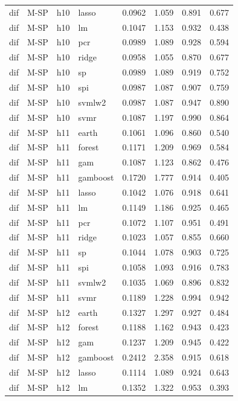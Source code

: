 \begin{ThreePartTable}
\begin{longtable}[t]{llclcccc}
dif & M-SP & h10 & lasso & 0.0962 & 1.059 & 0.891 & 0.677\\
dif & M-SP & h10 & lm & 0.1047 & 1.153 & 0.932 & 0.438\\
dif & M-SP & h10 & pcr & 0.0989 & 1.089 & 0.928 & 0.594\\
dif & M-SP & h10 & ridge & 0.0958 & 1.055 & 0.870 & 0.677\\
dif & M-SP & h10 & sp & 0.0989 & 1.089 & 0.919 & 0.752\\
dif & M-SP & h10 & spi & 0.0987 & 1.087 & 0.907 & 0.759\\
dif & M-SP & h10 & svmlw2 & 0.0987 & 1.087 & 0.947 & 0.890\\
dif & M-SP & h10 & svmr & 0.1087 & 1.197 & 0.990 & 0.864\\
\addlinespace
dif & M-SP & h11 & earth & 0.1061 & 1.096 & 0.860 & 0.540\\
dif & M-SP & h11 & forest & 0.1171 & 1.209 & 0.969 & 0.584\\
dif & M-SP & h11 & gam & 0.1087 & 1.123 & 0.862 & 0.476\\
dif & M-SP & h11 & gamboost & 0.1720 & 1.777 & 0.914 & 0.405\\
dif & M-SP & h11 & lasso & 0.1042 & 1.076 & 0.918 & 0.641\\
dif & M-SP & h11 & lm & 0.1149 & 1.186 & 0.925 & 0.465\\
dif & M-SP & h11 & pcr & 0.1072 & 1.107 & 0.951 & 0.491\\
dif & M-SP & h11 & ridge & 0.1023 & 1.057 & 0.855 & 0.660\\
dif & M-SP & h11 & sp & 0.1044 & 1.078 & 0.903 & 0.725\\
dif & M-SP & h11 & spi & 0.1058 & 1.093 & 0.916 & 0.783\\
dif & M-SP & h11 & svmlw2 & 0.1035 & 1.069 & 0.896 & 0.832\\
dif & M-SP & h11 & svmr & 0.1189 & 1.228 & 0.994 & 0.942\\
\addlinespace
dif & M-SP & h12 & earth & 0.1327 & 1.297 & 0.927 & 0.484\\
dif & M-SP & h12 & forest & 0.1188 & 1.162 & 0.943 & 0.423\\
dif & M-SP & h12 & gam & 0.1237 & 1.209 & 0.945 & 0.422\\
dif & M-SP & h12 & gamboost & 0.2412 & 2.358 & 0.915 & 0.618\\
dif & M-SP & h12 & lasso & 0.1114 & 1.089 & 0.924 & 0.643\\
dif & M-SP & h12 & lm & 0.1352 & 1.322 & 0.953 & 0.393\\

\end{longtable}
\end{ThreePartTable}
